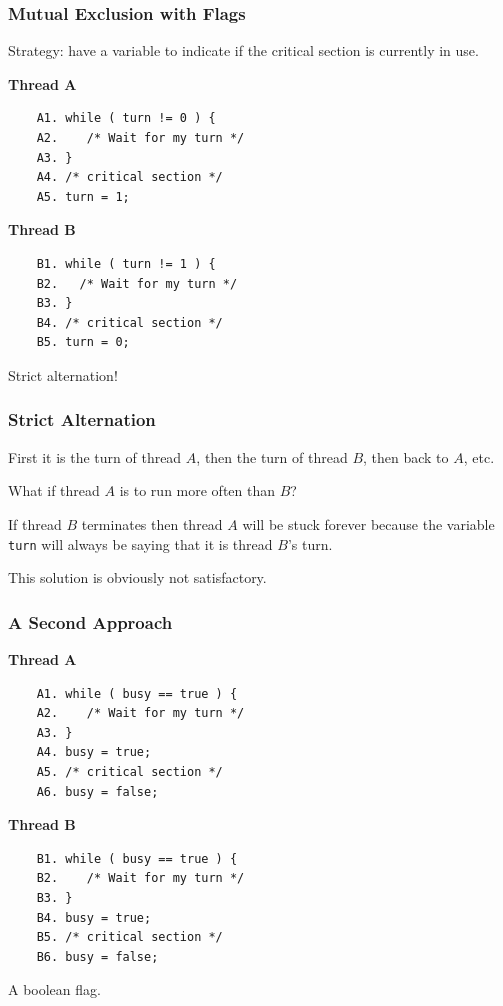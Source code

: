 \begin{frame}[fragile]
	\frametitle{Mutual Exclusion with Flags}

	Strategy: have a variable to indicate if the critical section is currently in use.

	\begin{multicols}{2}
		\textbf{Thread A}
		\begin{verbatim}
	A1. while ( turn != 0 ) {
	A2.    /* Wait for my turn */
	A3. }
	A4. /* critical section */
	A5. turn = 1;
	\end{verbatim}
		\columnbreak
		\textbf{Thread B}
		\begin{verbatim}
	B1. while ( turn != 1 ) {
	B2.   /* Wait for my turn */
	B3. }
	B4. /* critical section */
	B5. turn = 0;
	\end{verbatim}
	\end{multicols}

	Strict alternation!

\end{frame}

\begin{frame}
	\frametitle{Strict Alternation}

	First it is the turn of thread $A$, then the turn of thread $B$, then back to $A$, etc.

	What if thread $A$ is to run more often than $B$?

	If thread $B$ terminates then thread $A$ will be stuck forever because the variable \texttt{turn} will always be saying that it is thread $B$'s turn.

	This solution is obviously not satisfactory.

\end{frame}

\begin{frame}[fragile]
	\frametitle{A Second Approach}

	\begin{multicols}{2}
		\textbf{Thread A}
		\begin{verbatim}
	A1. while ( busy == true ) {
	A2.    /* Wait for my turn */
	A3. }
	A4. busy = true;
	A5. /* critical section */
	A6. busy = false;
	\end{verbatim}
		\columnbreak
		\textbf{Thread B}
		\begin{verbatim}
	B1. while ( busy == true ) {
	B2.    /* Wait for my turn */
	B3. }
	B4. busy = true;
	B5. /* critical section */
	B6. busy = false;
	\end{verbatim}
	\end{multicols}

	A boolean flag.

\end{frame}

